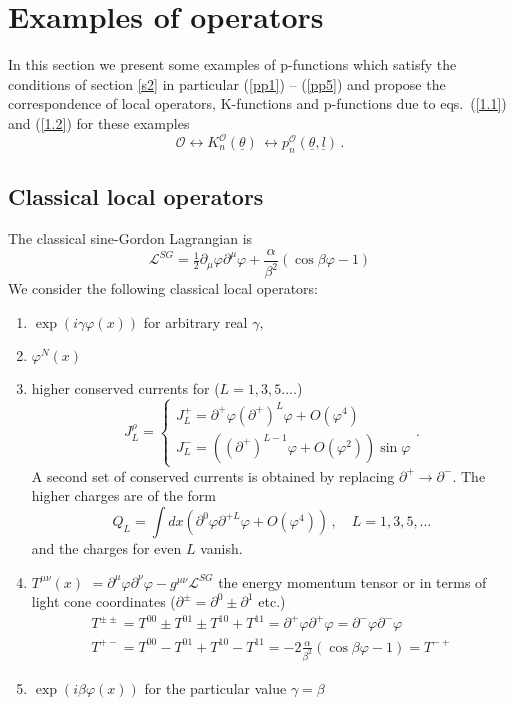 \documentclass[a4paper,a4paper]{article}
\begin{document}
\section{Examples of operators\label{s4}}

In this section we present some examples of p-functions which satisfy the
conditions of section \ref{s2} in particular (\ref{pp1}) -- (\ref{pp5}) and
propose the correspondence of local operators, K-functions and p-functions
due to eqs.~(\ref{1.1}) and (\ref{1.2}) for these examples 
\[
\mathcal{O}\leftrightarrow K_{n}^{\mathcal{O}}(\underline{\theta }%
)\,\leftrightarrow p_{n}^{\mathcal{O}}(\underline{\theta },\underline{l})\,. 
\]

\subsection{Classical local operators}

The classical sine-Gordon Lagrangian is 
\[
\mathcal{L}^{SG}=\tfrac{1}{2}\partial _{\mu }\varphi \partial ^{\mu }\varphi
+\frac{\alpha }{\beta ^{2}}\left( \cos \beta \varphi -1\right) 
\]
We consider the following classical local operators:

\begin{enumerate}
\item  $\exp \left( i\gamma \varphi (x)\right) $ for arbitrary real $\gamma
, $

\item  $\varphi ^{N}(x)$

\item  higher conserved currents for ($L=1,3,5.\dots $) 
\[
J_{L}^{\rho }=\left\{ 
\begin{array}{c}
J_{L}^{+}=\partial ^{+}\varphi \left( \partial ^{+}\right) ^{L}\varphi
+O(\varphi ^{4}) \\ 
J_{L}^{-}=\left( \left( \partial ^{+}\right) ^{L-1}\varphi +O(\varphi
^{2})\right) \sin \varphi
\end{array}
\right. . 
\]
A second set of conserved currents is obtained by replacing $\partial
^{+}\rightarrow \partial ^{-}$. The higher charges are of the form 
\[
Q_{L}=\int dx\left( \partial ^{0}\varphi \partial ^{+L}\varphi +O(\varphi
^{4})\right) \,,\quad L=1,3,5,\dots 
\]
and the charges for even $L$ vanish.

\item  $T^{\mu \nu }(x)$ $=\partial ^{\mu }\varphi \partial ^{\nu }\varphi
-g^{\mu \nu }\mathcal{L}^{SG}$ the energy momentum tensor or in terms of
light cone coordinates ($\partial ^{\pm }=\partial ^{0}\pm \partial ^{1}$
etc.) 
\begin{eqnarray*}
T^{\pm \pm }=T^{00}\pm T^{01}\pm T^{10}+T^{11}=\partial ^{+}\varphi \partial
^{+}\varphi =\partial ^{-}\varphi \partial ^{-}\varphi \\
T^{+-}=T^{00}-T^{01}+T^{10}-T^{11}=-2\frac{\alpha }{\beta ^{2}}\left( \cos
\beta \varphi -1\right) =T^{-+}
\end{eqnarray*}

\item  $\exp \left( i\beta \varphi (x)\right) $ for the particular value $%
\gamma =\beta $
\end{enumerate}
\end{document}
